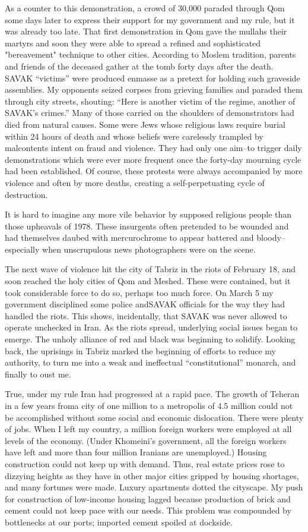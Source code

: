 As a counter to this demonstration, a crowd of 30,000 paraded through Qom some days later to express their support for my government and my rule, but it was already too late. That first demonstration in Qom gave the mullahs their martyrs and soon they were able to spread a refined and sophisticated "bereavement" technique to other cities. According to Moslem tradition, parents and friends of the deceased gather at the tomb forty days after the death. SAVAK “victims” were produced enmasse as a pretext for holding such graveside assemblies. My opponents seized corpses from grieving families and paraded them through city streets, shouting: “Here is another victim of the regime, another of SAVAK’s crimes.” Many of those carried on the shoulders of demonstrators had died from natural causes. Some were Jews whose religious laws require burial within 24 hours of death and whose beliefs were carelessly trampled by malcontents intent on fraud and violence. They had only one aim--to trigger daily demonstrations which were ever more frequent once the forty-day mourning cycle had been established. Of course, these protests were always accompanied by more violence and often by more deaths, creating a self-perpetuating cycle of destruction. 

It is hard to imagine any more vile behavior by supposed religious people than those upheavals of 1978. These insurgents often pretended to be wounded and had themselves daubed with mercurochrome to appear battered and bloody--especially when unscrupulous news photographers were on the scene. 

The next wave of violence hit the city of Tabriz in the riots of February 18, and soon reached the holy cities of Qom and Meshed. These were contained, but it took considerable force to do so, perhaps too much force. On March 5 my government disciplined some police andSAVAK officials for the way they had handled the riots. This shows, incidentally, that SAVAK was never allowed to operate unchecked in Iran. As the riots spread, underlying social issues began to emerge. The unholy alliance of red and black was beginning to solidify. Looking back, the uprisings in Tabriz marked the beginning of efforts to reduce my authority, to turn me into a weak and ineffectual “constitutional” monarch, and finally to oust me. 

True, under my rule Iran had progressed at a rapid pace. The growth of Teheran in a few years froma city of one million to a metropolis of 4.5 million could not be accomplished without some social and economic dislocation. There were plenty of jobs. When I left my country, a million foreign workers were employed at all levels of the economy. (Under Khomeini's government, all the foreign workers have left and more than four million Iranians are unemployed.) Housing construction could not keep up with demand. Thus, real estate prices rose to dizzying heights as they have in other major cities gripped by housing shortages, and many fortunes were made. Luxury apartments dotted the cityscape. My push for construction of low-income housing lagged because production of brick and cement could not keep pace with our needs. This problem was compounded by bottlenecks at our ports; imported cement spoiled at dockside. 

